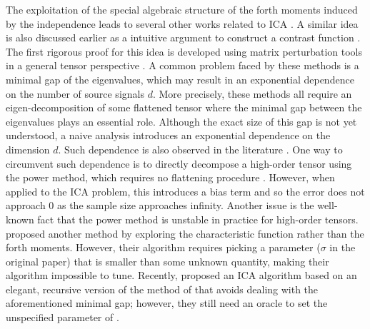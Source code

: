 \documentclass[twoside,11pt]{article}
\newcommand{\todoa}[2][]{ \todo[color=Purple!20,size=\tiny,#1]{#2}} %
\begin{document}
The exploitation of the special algebraic structure of the forth moments induced by the independence leads to several other works related to ICA \citep{hsu2013learning,goyal2014fourier,vempala2014max}. 
A similar idea is also discussed earlier as a intuitive argument to construct a contrast function \citep{cardoso1999high}. 
The first rigorous proof for this idea is developed using matrix perturbation tools in a general tensor perspective \citep{goyal2014fourier}. 
A common problem faced by these methods is a minimal gap of the eigenvalues, which may result in an exponential dependence on the number of source signals $d$.
More precisely, these methods all require an eigen-decomposition of some flattened tensor where the minimal gap between the eigenvalues plays an essential role. 
Although the exact size of this gap is not yet understood, a naive analysis introduces an exponential dependence on the dimension $d$. 
Such dependence is also observed in the literature \citep{cardoso1999high,goyal2014fourier}.
One way to circumvent such dependence is to directly decompose a high-order tensor using the power method, which requires no flattening procedure \citep{anandkumar2014guaranteed}. 
However, when applied to the ICA problem, this introduces a bias term and so the error does not approach 0 as the sample size approaches infinity.
Another issue is the well-known fact that the power method is unstable in practice for high-order tensors. 
\citet{goyal2014fourier} proposed another method by exploring the characteristic function rather than the forth moments.
However, their algorithm requires picking a parameter ($\sigma$ in the original paper) that is smaller than some unknown quantity, making their algorithm impossible to tune.
Recently, \citet{vempala2014max} proposed an ICA algorithm based on an elegant, recursive version of the method of \citet{goyal2014fourier} that avoids dealing with the aforementioned minimal gap; however, they still need an oracle to set the unspecified parameter of \citet{goyal2014fourier}.
\end{document}
